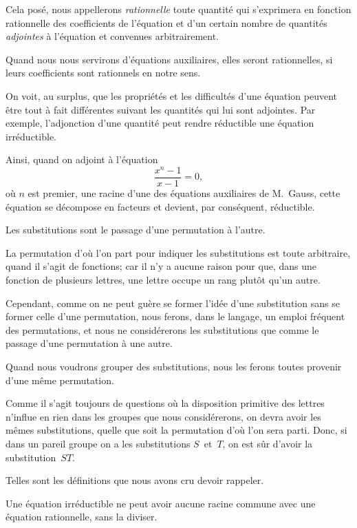 \documentclass[leqno,12pt]{book}[2005/09/16]
\newenvironment{MyEnvt}[2]{%
  \medskip\par
  \ifthenelse{\equal{#1}{}}{%
    \textsc{#2.}\ --- %
  }{%
    \textsc{#2 #1}\ --- %
  }%
  \itshape\ignorespaces
}{\medskip\normalfont}
\newenvironment{Lemme}[1][]{\begin{MyEnvt}{#1}{Lemme}}{\end{MyEnvt}}
\newcommand{\DPtypo}[2]{#2}
\begin{document}
Cela posé, nous appellerons \emph{rationnelle} toute quantité qui
s'exprimera en fonction rationnelle des coefficients de l'équation
et d'un certain nombre de quantités \emph{adjointes} à l'équation et
convenues arbitrairement.

Quand nous nous servirons d'équations auxiliaires, elles seront
rationnelles, si leurs coefficients sont rationnels en notre sens.

On voit, au surplus, que les propriétés et les difficultés d'une
équation peuvent être tout à fait différentes suivant les quantités
qui lui sont adjointes. Par exemple, l'adjonction d'une quantité
peut rendre réductible une équation irréductible.

Ainsi, quand on adjoint à l'équation
\[
\frac{x^{n} - 1}{x - 1} = 0\DPtypo{.}{,}
\]
où $n$ est premier, une racine d'une des équations auxiliaires de
M.~Gauss, cette équation se décompose en facteurs et devient, par
conséquent, réductible.

Les substitutions sont le passage d'une permutation à l'autre.

La permutation d'où l'on part pour indiquer les substitutions
est toute arbitraire, quand il s'agit de fonctions; car il n'y a aucune
raison pour que, dans une fonction de plusieurs lettres, une
lettre occupe un rang plutôt qu'un autre.

Cependant, comme on ne peut guère se former l'idée d'une
substitution sans se former celle d'une permutation, nous ferons,
dans le langage, un emploi fréquent des permutations, et nous ne
considérerons les substitutions que comme le passage d'une permutation
à une autre.

Quand nous voudrons grouper des substitutions, nous les ferons
toutes provenir d'une même permutation.

Comme il s'agit toujours de questions où la disposition primitive
des lettres n'influe en rien dans les groupes que nous considérerons,
on devra avoir les mêmes substitutions, quelle que soit
la permutation d'où l'on sera parti. Donc, si dans un pareil
groupe on a les substitutions $S$~et~$T$, on est sûr d'avoir la substitution~$ST$.

Telles sont les définitions que nous avons cru devoir rappeler.

\begin{Lemme}[I.]
Une équation irréductible ne peut avoir aucune
racine commune avec une équation rationnelle, sans la diviser.
\end{Lemme}
\end{document}
